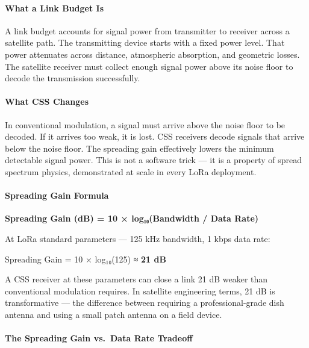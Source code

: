 \documentclass[
  11pt,
]{article}
\begin{document}
\hypertarget{what-a-link-budget-is}{%
\paragraph{What a Link Budget Is}\label{what-a-link-budget-is}}

A link budget accounts for signal power from transmitter to receiver
across a satellite path. The transmitting device starts with a fixed
power level. That power attenuates across distance, atmospheric
absorption, and geometric losses. The satellite receiver must collect
enough signal power above its noise floor to decode the transmission
successfully.

\hypertarget{what-css-changes}{%
\paragraph{What CSS Changes}\label{what-css-changes}}

In conventional modulation, a signal must arrive above the noise floor
to be decoded. If it arrives too weak, it is lost. CSS receivers decode
signals that arrive below the noise floor. The spreading gain
effectively lowers the minimum detectable signal power. This is not a
software trick --- it is a property of spread spectrum physics,
demonstrated at scale in every LoRa deployment.

\hypertarget{spreading-gain-formula}{%
\paragraph{Spreading Gain Formula}\label{spreading-gain-formula}}

\textbf{Spreading Gain (dB) = 10 × log₁₀(Bandwidth / Data Rate)}

At LoRa standard parameters --- 125 kHz bandwidth, 1 kbps data rate:

Spreading Gain = 10 × log₁₀(125) ≈ \textbf{21 dB}

A CSS receiver at these parameters can close a link 21 dB weaker than
conventional modulation requires. In satellite engineering terms, 21 dB
is transformative --- the difference between requiring a
professional-grade dish antenna and using a small patch antenna on a
field device.

\hypertarget{the-spreading-gain-vs.-data-rate-tradeoff}{%
\paragraph{The Spreading Gain vs.~Data Rate
Tradeoff}\label{the-spreading-gain-vs.-data-rate-tradeoff}}
\end{document}
